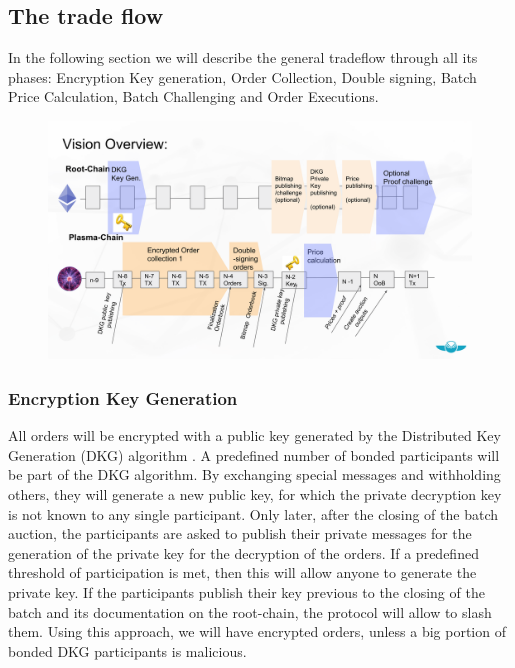 \documentclass[11pt,parskip=full]{scrartcl}%
\begin{document}
\subsection{The trade flow}
\label{subsec:data}

In the following section we will describe the general tradeflow through all its phases: Encryption Key generation, Order Collection, Double signing, Batch Price Calculation, Batch Challenging and Order Executions.


\begin{figure}
\centering
\includegraphics[width=\textwidth]{overview_tradeflow.png}
\end{figure}



\subsubsection{Encryption Key Generation}
All orders will be encrypted with a public key generated by the Distributed Key Generation (DKG) algorithm \cite{DKG}. A predefined number of bonded participants will be part of the DKG algorithm.  By exchanging special messages and withholding others, they will generate a new public key, for which the private decryption key is not known to any single participant. Only later, after the closing of the batch auction, the participants are asked to publish their private messages for the generation of the private key for the decryption of the orders. If a predefined threshold of participation is met, then this will allow anyone to generate the private key. If the participants publish their key previous to the closing of the batch and its documentation on the root-chain, the protocol will allow to slash them. Using this approach, we will have encrypted orders, unless a big portion of bonded DKG participants is malicious.
\end{document}
